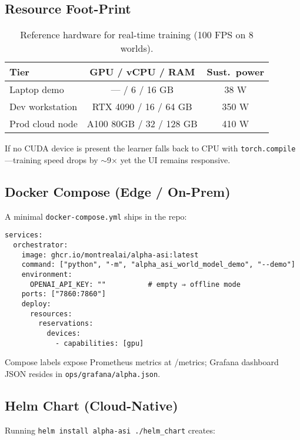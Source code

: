 \subsection{Resource Foot-Print}

\begin{table}[h]\centering
\caption{Reference hardware for real-time training (100 FPS on 8 worlds).}
\label{tab:hw}
\begin{tabular}{@{}lcc@{}}
\toprule
\textbf{Tier} & \textbf{GPU / vCPU / RAM} & \textbf{Sust.\ power}\\
\midrule
Laptop demo           & --- / 6 / 16 GB & 38 W  \\
Dev workstation       & RTX 4090 / 16 / 64 GB & 350 W \\
Prod cloud node       & A100 80GB / 32 / 128 GB & 410 W \\
\bottomrule
\end{tabular}
\end{table}

If no CUDA device is present the learner falls back to CPU with
\texttt{torch.compile}—training speed drops by $\sim$9× yet the UI remains
responsive.

\subsection{Docker Compose (Edge / On-Prem)}

A minimal \texttt{docker-compose.yml} ships in the repo:

\begin{verbatim}
services:
  orchestrator:
    image: ghcr.io/montrealai/alpha-asi:latest
    command: ["python", "-m", "alpha_asi_world_model_demo", "--demo"]
    environment:
      OPENAI_API_KEY: ""          # empty ⇒ offline mode
    ports: ["7860:7860"]
    deploy:
      resources:
        reservations:
          devices:
            - capabilities: [gpu]
\end{verbatim}

Compose labels expose Prometheus metrics at /metrics;
Grafana dashboard JSON resides in \texttt{ops/grafana/alpha.json}.

\subsection{Helm Chart (Cloud-Native)}

Running \verb|helm install alpha-asi ./helm_chart| creates:

